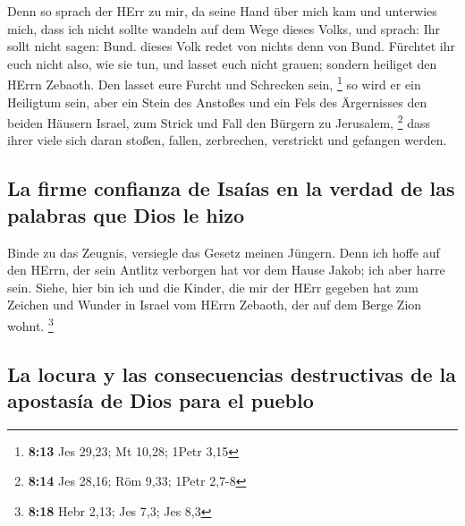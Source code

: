  Denn so sprach der HErr zu mir, da seine Hand über mich
kam und unterwies mich, dass ich nicht sollte wandeln auf dem Wege
dieses Volks, und sprach:  Ihr sollt nicht sagen: Bund.
dieses Volk redet von nichts denn von Bund. Fürchtet ihr euch nicht
also, wie sie tun, und lasset euch nicht grauen;  sondern
heiliget den HErrn Zebaoth. Den lasset eure Furcht und Schrecken sein,
\footnote{\textbf{8:13} Jes 29,23; Mt 10,28; 1Petr 3,15} 
so wird er ein Heiligtum sein, aber ein Stein des Anstoßes und ein Fels
des Ärgernisses den beiden Häusern Israel, zum Strick und Fall den
Bürgern zu Jerusalem, \footnote{\textbf{8:14} Jes 28,16; Röm 9,33; 1Petr
  2,7-8}  dass ihrer viele sich daran stoßen, fallen,
zerbrechen, verstrickt und gefangen werden.

\hypertarget{la-firme-confianza-de-isauxedas-en-la-verdad-de-las-palabras-que-dios-le-hizo}{%
\subsection{La firme confianza de Isaías en la verdad de las palabras
que Dios le
hizo}\label{la-firme-confianza-de-isauxedas-en-la-verdad-de-las-palabras-que-dios-le-hizo}}

 Binde zu das Zeugnis, versiegle das Gesetz meinen
Jüngern.  Denn ich hoffe auf den HErrn, der sein Antlitz
verborgen hat vor dem Hause Jakob; ich aber harre sein. 
Siehe, hier bin ich und die Kinder, die mir der HErr gegeben hat zum
Zeichen und Wunder in Israel vom HErrn Zebaoth, der auf dem Berge Zion
wohnt. \footnote{\textbf{8:18} Hebr 2,13; Jes 7,3; Jes 8,3}

\hypertarget{la-locura-y-las-consecuencias-destructivas-de-la-apostasuxeda-de-dios-para-el-pueblo}{%
\subsection{La locura y las consecuencias destructivas de la apostasía
de Dios para el
pueblo}\label{la-locura-y-las-consecuencias-destructivas-de-la-apostasuxeda-de-dios-para-el-pueblo}}

